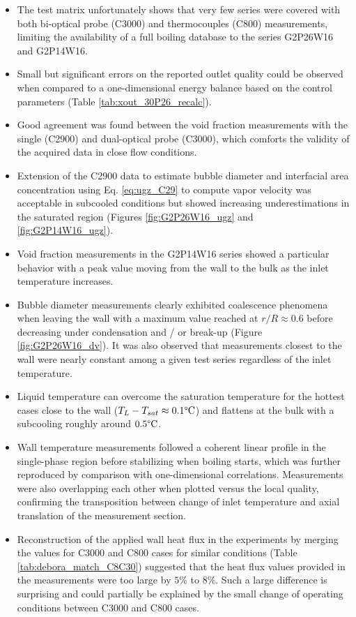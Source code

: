 \begin{itemize}
\item The test matrix unfortunately shows that very few series were covered with both bi-optical probe (C3000) and thermocouples (C800) measurements, limiting the availability of a full boiling database to the series G2P26W16 and G2P14W16.

\item Small but significant errors on the reported outlet quality could be observed when compared to a one-dimensional energy balance based on the control parameters (Table \ref{tab:xout_30P26_recalc}).

\item Good agreement was found between the void fraction measurements with the single (C2900) and dual-optical probe (C3000), which comforts the validity of the acquired data in close flow conditions.

\item Extension of the C2900 data to estimate bubble diameter and interfacial area concentration using Eq. \ref{eq:ugz_C29} to compute vapor velocity was acceptable in subcooled conditions but showed increasing underestimations in the saturated region (Figures \ref{fig:G2P26W16_ugz} and \ref{fig:G2P14W16_ugz}).

\item Void fraction measurements in the G2P14W16 series showed a particular behavior with a peak value moving from the wall to the bulk as the inlet temperature increases.

\item Bubble diameter measurements clearly exhibited coalescence phenomena when leaving the wall with a maximum value reached at $r/R \approx 0.6$ before decreasing under condensation and / or break-up (Figure \ref{fig:G2P26W16_dv}). It was also observed that measurements closest to the wall were nearly constant among a given test series regardless of the inlet temperature.

\item Liquid temperature can overcome the saturation temperature for the hottest cases close to the wall ($T_{L}-T_{sat}\approx 0.1\degree\mathrm{C}$) and flattens at the bulk with a subcooling roughly around $0.5\degree\mathrm{C}$.

\item Wall temperature measurements followed a coherent linear profile in the single-phase region before stabilizing when boiling starts, which was further reproduced by comparison with one-dimensional correlations. Measurements were also overlapping each other when plotted versus the local quality, confirming the transposition between change of inlet temperature and axial translation of the measurement section.

\item Reconstruction of the applied wall heat flux in the experiments by merging the values for C3000 and C800 cases for similar conditions (Table \ref{tab:debora_match_C8C30}) suggested that the heat flux values provided in the measurements were too large by $5\%$ to $8\%$. Such a large difference is surprising and could partially be explained by the small change of operating conditions between C3000 and C800 cases.
\end{itemize}



